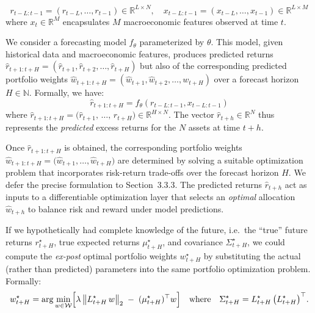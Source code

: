 \begin{equation} r_{t-L: t-1}=\left(r_{t-L}, \ldots, r_{t-1}\right) \in \mathbb{R}^{L \times N},
            \quad x_{t-L: t-1}=\left(x_{t-L}, \ldots, x_{t-1}\right) \in \mathbb{R}^{L \times M}
\end{equation} where $x_{t} \in \mathbb{R}^{M}$ encapsulates $M$ macroeconomic features observed at time $t$.

We consider a forecasting model $ f_{\theta} $ parameterized by $\theta$. This model, given historical data and macroeconomic features, produces predicted returns $\hat{r}_{t+1:t+H} = (\hat{r}_{t+1}, \hat{r}_{t+2}, \ldots, \hat{r}_{t+H})$ but also of the corresponding predicted portfolio weights ${\hat{w}}_{t+1:t+H} = ({\hat{w}}_{t+1}, {\hat{w}}_{t+2}, \ldots, {w}_{t+H})$ over a forecast horizon $ H \in \mathbb{N} $. Formally, we have: 
\begin{equation} 
{\hat{r}}_{t+1: t+H}=f_{\theta}\left(r_{t-L: t-1}, x_{t-L: t-1}\right) 
\end{equation}
where $\widehat{r}_{t+1:t+H} = \bigl(\widehat{r}_{t+1},\,\ldots,\,\widehat{r}_{t+H}\bigr)\in \mathbb{R}^{H\times N}$. The vector $\widehat{r}_{t+h}\in\mathbb{R}^{N}$ thus represents the \emph{predicted} excess returns for the $N$ assets at time $t+h$. 


Once $\hat{r}_{t+1 : t+H}$ is obtained, the corresponding portfolio weights $\hat{w}_{t+1 : t+H} 
= \bigl(\hat{w}_{t+1}, \ldots, \hat{w}_{t+H}\bigr)$ are determined by solving a suitable optimization problem that incorporates risk-return trade-offs over the forecast horizon $H$. We defer the precise formulation to Section~3.3.3. The predicted returns $\hat{r}_{t+h}$ act as inputs to a differentiable optimization layer that selects an \emph{optimal} allocation $\hat{w}_{t+h}$ to balance risk and reward under model predictions.

If we hypothetically had complete knowledge of the future, i.e.\ the ``true'' future returns $r_{t+H}^{\star}$, true expected returns $\mu_{t+H}^{\star}$, and covariance $\Sigma_{t+H}^{\star}$, we could compute the \emph{ex-post} optimal portfolio weights $w_{t+H}^{\star}$ by substituting the actual (rather than predicted) parameters into the same portfolio optimization problem. Formally:
\begin{equation}
    w_{t+H}^{\star} 
    = \arg\min_{w \in \mathcal{W}}
    \Bigl[\lambda\,\bigl\|L_{t+H}^{\star}\,w \bigr\|_2 
    \;-\; (\mu_{t+H}^{\star})^{\top} w 
    \Bigr] 
    \quad \text{where} \quad
    \Sigma_{t+H}^{\star} 
    = L_{t+H}^{\star}\,\bigl(L_{t+H}^{\star}\bigr)^{\top}.
\end{equation}

